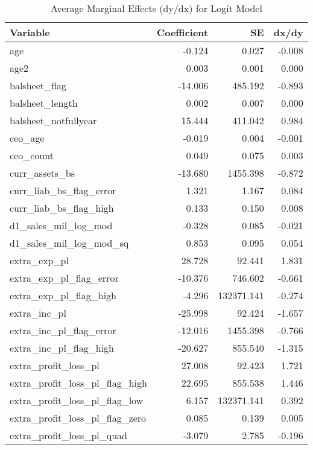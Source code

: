 \begin{table}

\caption{\label{tab:unnamed-chunk-14}Average Marginal Effects (dy/dx) for Logit Model}
\centering
\begin{tabular}[t]{l|r|r|r}
\hline
Variable & Coefficient & SE & dx/dy\\
\hline
age & -0.124 & 0.027 & -0.008\\
\hline
age2 & 0.003 & 0.001 & 0.000\\
\hline
balsheet\_flag & -14.006 & 485.192 & -0.893\\
\hline
balsheet\_length & 0.002 & 0.007 & 0.000\\
\hline
balsheet\_notfullyear & 15.444 & 411.042 & 0.984\\
\hline
ceo\_age & -0.019 & 0.004 & -0.001\\
\hline
ceo\_count & 0.049 & 0.075 & 0.003\\
\hline
curr\_assets\_bs & -13.680 & 1455.398 & -0.872\\
\hline
curr\_liab\_bs\_flag\_error & 1.321 & 1.167 & 0.084\\
\hline
curr\_liab\_bs\_flag\_high & 0.133 & 0.150 & 0.008\\
\hline
d1\_sales\_mil\_log\_mod & -0.328 & 0.085 & -0.021\\
\hline
d1\_sales\_mil\_log\_mod\_sq & 0.853 & 0.095 & 0.054\\
\hline
extra\_exp\_pl & 28.728 & 92.441 & 1.831\\
\hline
extra\_exp\_pl\_flag\_error & -10.376 & 746.602 & -0.661\\
\hline
extra\_exp\_pl\_flag\_high & -4.296 & 132371.141 & -0.274\\
\hline
extra\_inc\_pl & -25.998 & 92.424 & -1.657\\
\hline
extra\_inc\_pl\_flag\_error & -12.016 & 1455.398 & -0.766\\
\hline
extra\_inc\_pl\_flag\_high & -20.627 & 855.540 & -1.315\\
\hline
extra\_profit\_loss\_pl & 27.008 & 92.423 & 1.721\\
\hline
extra\_profit\_loss\_pl\_flag\_high & 22.695 & 855.538 & 1.446\\
\hline
extra\_profit\_loss\_pl\_flag\_low & 6.157 & 132371.141 & 0.392\\
\hline
extra\_profit\_loss\_pl\_flag\_zero & 0.085 & 0.139 & 0.005\\
\hline
extra\_profit\_loss\_pl\_quad & -3.079 & 2.785 & -0.196\\
\hline

\end{tabular}
\end{table}
